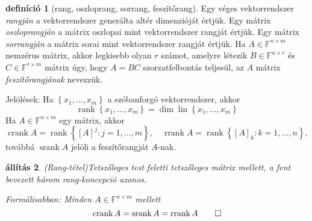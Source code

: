 \documentclass[9pt,showtrims]{memoir}
\theoremstyle{plain}
\newtheorem{proposition}{állítás}[chapter]
\theoremstyle{remark}
\theoremstyle{definition}
\newtheorem{definition}[proposition]{definíció}
\DeclareMathOperator{\lin}{lin}
\DeclareMathOperator{\crank}{crank}
\DeclareMathOperator{\rrank}{rrank}
\DeclareMathOperator{\srank}{srank}
\DeclareMathOperator{\rank}{rank}
\begin{document}
\begin{definition}[rang, oszloprang, sorrang, feszítőrang]
    Egy véges vektorrendszer \emph{rangján} a vektorrendszer generálta altér dimenzióját értjük.
    Egy mátrix \emph{oszloprangján} a mátrix oszlopai mint vektorrendszer rangját értjük.
    Egy mátrix \emph{sorrangján} a mátrix sorai mint vektorrendszer rangját értjük.
    Ha $A\in\mathbb{F}^{n\times m}$ nemzérus mátrix,
    akkor legkisebb olyan $r$ számot, amelyre
    létezik $B\in\mathbb{F}^{n\times r}$ és $C\in\mathbb{F}^{r\times m}$ mátrix úgy, hogy 
    $A=BC$ szorzatfelbontás teljesül,
    az $A$ mátrix \emph{feszítőrangjának} nevezzük.

    Jelölések: Ha $\left\{ x_1,\dots,x_m \right\}$ a szóbanforgó vektorrendszer, akkor
    \[
        \rank\left\{ x_1,\dots,x_m \right\}=\dim\lin\left\{ x_1,\dots,x_m \right\}
    \]
    Ha $A\in\mathbb{F}^{n\times m}$ egy mátrix,
    akkor 
    \[
        \crank{A}=\rank\left\{ [A]^{j}:j=1,\dots,m \right\},
        \quad
        \rrank{A}=\rank\left\{ [A]_k:k=1,\dots,n\right\},
    \]
    továbbá $\srank{A}$ jelöli a feszítőrangját $A$-nak.
\end{definition}
\begin{proposition}(Rang-tétel)\label{pr:rang}
    Tetszőleges test feletti tetszőleges mátrix mellett, a fent bevezett három rang-koncepció azonos.

    Formálisabban: Minden $A\in\mathbb{F}^{n\times m}$ mellett
    \[
        \crank{A}=\srank{A}=\rrank{A}\qedhere
    \]
\end{proposition}
\end{document}
